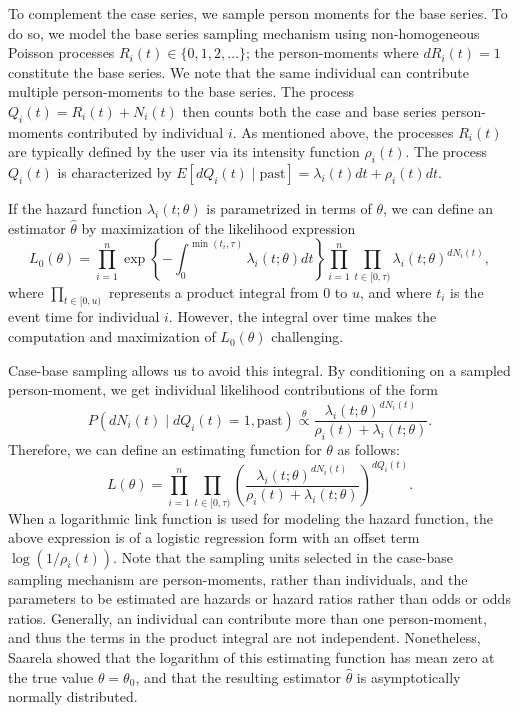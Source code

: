 To complement the case series, we sample person moments for the base
series. To do so, we model the base series sampling mechanism using
non-homogeneous Poisson processes \(R_i(t) \in \{0, 1, 2, \ldots\}\);
the person-moments where \(dR_i(t) = 1\) constitute the base series. We
note that the same individual can contribute multiple person-moments to
the base series. The process \(Q_{i}(t) = R_i(t) + N_{i}(t)\) then
counts both the case and base series person-moments contributed by
individual \(i\). As mentioned above, the processes \(R_i(t)\) are
typically defined by the user via its intensity function \(\rho_i(t)\).
The process \(Q_{i}(t)\) is characterized by
\(E[dQ_{i}(t)\mid\mathrm{past}] = \lambda_{i}(t)dt + \rho_i(t)dt\).

If the hazard function \(\lambda_{i}(t; \theta)\) is parametrized in
terms of \(\theta\), we can define an estimator \(\hat{\theta}\) by
maximization of the likelihood expression
\[L_0(\theta) = \prod_{i=1}^n \exp\left\{ -\int_0^{\min(t_i,\tau)} \lambda_i(t; \theta) dt \right\} \prod_{i=1}^{n} \prod_{t\in[0,\tau)} \lambda_{i}(t;\theta)^{dN_{i}(t)},\]
where \(\prod_{t\in[0,u)}\) represents a product integral from \(0\) to
\(u\), and where \(t_i\) is the event time for individual \(i\).
However, the integral over time makes the computation and maximization
of \(L_0(\theta)\) challenging.

Case-base sampling allows us to avoid this integral. By conditioning on
a sampled person-moment, we get individual likelihood contributions of
the form
\[P(dN_{i}(t) \mid dQ_{i}(t) = 1,\mathrm{past}) \stackrel{\theta}{\propto} \frac{\lambda_{i}(t; \theta)^{dN_{i}(t)}}{\rho_i(t) + \lambda_{i}(t;\theta)}.\]
Therefore, we can define an estimating function for \(\theta\) as
follows: \begin{equation}
L(\theta) = \prod_{i=1}^{n} \prod_{t\in[0,\tau)} \left(\frac{\lambda_{i}(t; \theta)^{dN_{i}(t)}}{\rho_i(t) + \lambda_{i}(t;\theta)}\right)^{dQ_i(t)}. \label{eq:lik-function}
\end{equation} When a logarithmic link function is used for modeling the
hazard function, the above expression is of a logistic regression form
with an offset term \(\log(1/\rho_i(t))\). Note that the sampling units
selected in the case-base sampling mechanism are person-moments, rather
than individuals, and the parameters to be estimated are hazards or
hazard ratios rather than odds or odds ratios. Generally, an individual
can contribute more than one person-moment, and thus the terms in the
product integral are not independent. Nonetheless, Saarela
\citeyearpar{saarela2016case} showed that the logarithm of this
estimating function has mean zero at the true value \(\theta=\theta_0\),
and that the resulting estimator \(\hat{\theta}\) is asymptotically
normally distributed.


